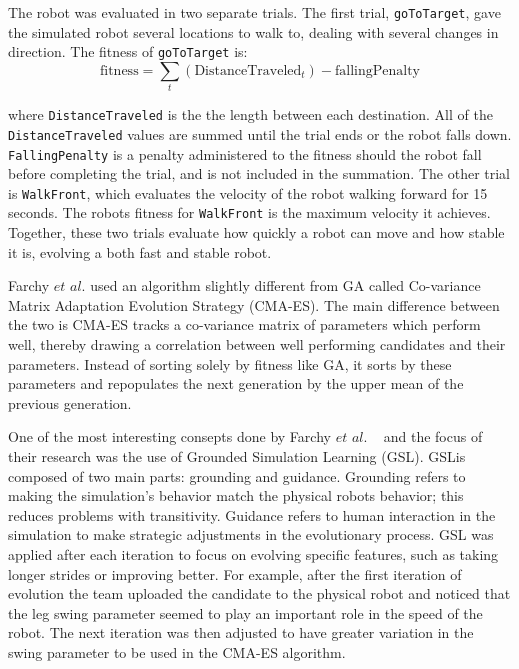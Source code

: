 \documentclass{sig-alternate}
\begin{document}
 The robot was evaluated in two separate trials. The first trial, {\tt goToTarget}, gave the simulated robot several locations to walk to, dealing with several changes in direction. The fitness of {\tt goToTarget} is:
\[
  \textrm{fitness} = \sum_{t} (\textrm{DistanceTraveled}_t) - \textrm{fallingPenalty}
\] 

 where {\tt DistanceTraveled} is the the length between each destination. All of the {\tt DistanceTraveled} values are summed until the trial ends or the robot falls down. {\tt FallingPenalty} is a penalty administered to the fitness should the robot fall before completing the trial, and is not included in the summation. The other trial is {\tt WalkFront}, which evaluates the velocity of the robot walking forward for 15 seconds. The robots fitness for {\tt WalkFront} is the maximum velocity it achieves. Together, these two trials evaluate how quickly a robot can move and how stable it is, evolving a both fast and stable robot.
  
  Farchy $et$ $al.$ used an algorithm slightly different from GA called Co-variance Matrix Adaptation Evolution Strategy (CMA-ES). The main difference between the two is CMA-ES tracks a co-variance matrix of parameters which perform well, thereby drawing a correlation between well performing candidates and their parameters. Instead of sorting solely by fitness like GA, it sorts by these parameters and repopulates the next generation by the upper mean of the previous generation.
  
  One of the most interesting consepts done by Farchy $et$ $al.$ ~\cite{Farchy:2013:HRL:2484920.2484930} and the focus of their research was the use of Grounded Simulation Learning (GSL). GSLis composed of two main parts: grounding and guidance. Grounding refers to making the simulation's behavior match the physical robots behavior; this reduces problems with transitivity. Guidance refers to human interaction in the simulation to make strategic adjustments in the evolutionary process. GSL was applied after each iteration to focus on evolving specific features, such as taking longer strides or improving better. For example, after the first iteration of evolution the team uploaded the candidate to the physical robot and noticed that the leg swing parameter seemed to play an important role in the speed of the robot. The next iteration was then adjusted to have greater variation in the swing parameter to be used in the CMA-ES algorithm. 
\end{document}
